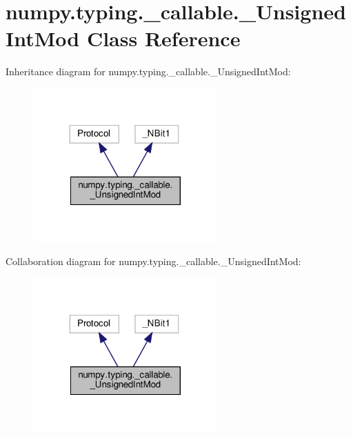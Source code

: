 \hypertarget{classnumpy_1_1typing_1_1__callable_1_1__UnsignedIntMod}{}\section{numpy.\+typing.\+\_\+callable.\+\_\+\+Unsigned\+Int\+Mod Class Reference}
\label{classnumpy_1_1typing_1_1__callable_1_1__UnsignedIntMod}


Inheritance diagram for numpy.\+typing.\+\_\+callable.\+\_\+\+Unsigned\+Int\+Mod\+:
\nopagebreak
\begin{figure}[H]
\begin{center}
\leavevmode
\includegraphics[width=200pt]{classnumpy_1_1typing_1_1__callable_1_1__UnsignedIntMod__inherit__graph}
\end{center}
\end{figure}


Collaboration diagram for numpy.\+typing.\+\_\+callable.\+\_\+\+Unsigned\+Int\+Mod\+:
\nopagebreak
\begin{figure}[H]
\begin{center}
\leavevmode
\includegraphics[width=200pt]{classnumpy_1_1typing_1_1__callable_1_1__UnsignedIntMod__coll__graph}
\end{center}
\end{figure}

